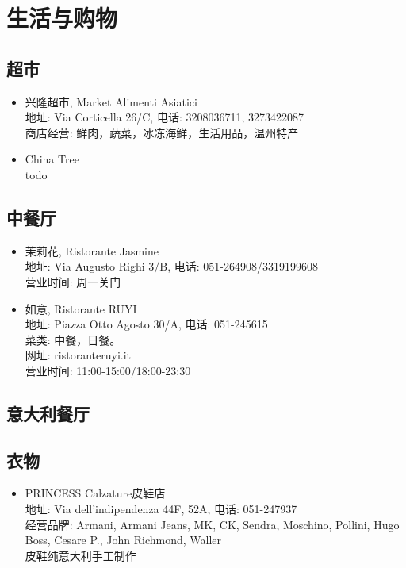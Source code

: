 \chapter{生活与购物}              



\section{超市}
\begin{itemize}
\item 兴隆超市, Market Alimenti Asiatici\\
地址: Via Corticella 26/C, 电话: 3208036711, 3273422087\\
商店经营: 鲜肉，蔬菜，冰冻海鲜，生活用品，温州特产

\item China Tree\\
todo
\end{itemize}



\section{中餐厅}
\begin{itemize}
\item 茉莉花, Ristorante Jasmine\\
地址: Via Augusto Righi 3/B, 电话: 051-264908/3319199608 \\
营业时间: 周一关门

\item 如意, Ristorante RUYI\\
地址: Piazza Otto Agosto 30/A, 电话: 051-245615\\
菜类: 中餐，日餐。\\
网址: ristoranteruyi.it \\
营业时间: 11:00-15:00/18:00-23:30

\end{itemize}


\section{意大利餐厅}

\section{衣物}
\begin{itemize}
\item PRINCESS Calzature皮鞋店\\
地址: Via dell'indipendenza 44F, 52A, 电话: 051-247937\\
经营品牌: Armani, Armani Jeans, MK, CK, Sendra, Moschino, Pollini, Hugo Boss, Cesare P., John Richmond, Waller\\
皮鞋纯意大利手工制作
\end{itemize}

